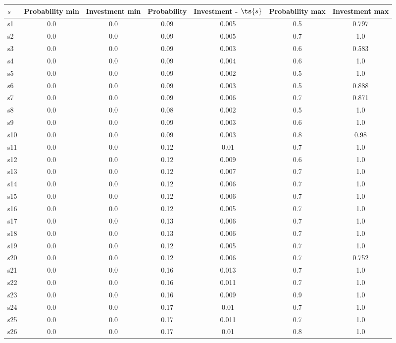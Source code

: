 \documentclass{article}
\begin{document}
\noindent\begin{tabular}{|l|c|c|c|c|c|c|}
\hline
$s$& Probability min & Investment min & Probability & Investment - $\ts{s}$ & Probability max & Investment max\\
\hline
s1 &0.0 & 0.0 & 0.09 & 0.005 & 0.5 & 0.797\\
\hline
s2 &0.0 & 0.0 & 0.09 & 0.005 & 0.7 & 1.0\\
\hline
s3 &0.0 & 0.0 & 0.09 & 0.003 & 0.6 & 0.583\\
\hline
s4 &0.0 & 0.0 & 0.09 & 0.004 & 0.6 & 1.0\\
\hline
s5 &0.0 & 0.0 & 0.09 & 0.002 & 0.5 & 1.0\\
\hline
s6 &0.0 & 0.0 & 0.09 & 0.003 & 0.5 & 0.888\\
\hline
s7 &0.0 & 0.0 & 0.09 & 0.006 & 0.7 & 0.871\\
\hline
s8 &0.0 & 0.0 & 0.08 & 0.002 & 0.5 & 1.0\\
\hline
s9 &0.0 & 0.0 & 0.09 & 0.003 & 0.6 & 1.0\\
\hline
s10 &0.0 & 0.0 & 0.09 & 0.003 & 0.8 & 0.98\\
\hline
s11 &0.0 & 0.0 & 0.12 & 0.01 & 0.7 & 1.0\\
\hline
s12 &0.0 & 0.0 & 0.12 & 0.009 & 0.6 & 1.0\\
\hline
s13 &0.0 & 0.0 & 0.12 & 0.007 & 0.7 & 1.0\\
\hline
s14 &0.0 & 0.0 & 0.12 & 0.006 & 0.7 & 1.0\\
\hline
s15 &0.0 & 0.0 & 0.12 & 0.006 & 0.7 & 1.0\\
\hline
s16 &0.0 & 0.0 & 0.12 & 0.005 & 0.7 & 1.0\\
\hline
s17 &0.0 & 0.0 & 0.13 & 0.006 & 0.7 & 1.0\\
\hline
s18 &0.0 & 0.0 & 0.13 & 0.006 & 0.7 & 1.0\\
\hline
s19 &0.0 & 0.0 & 0.12 & 0.005 & 0.7 & 1.0\\
\hline
s20 &0.0 & 0.0 & 0.12 & 0.006 & 0.7 & 0.752\\
\hline
s21 &0.0 & 0.0 & 0.16 & 0.013 & 0.7 & 1.0\\
\hline
s22 &0.0 & 0.0 & 0.16 & 0.011 & 0.7 & 1.0\\
\hline
s23 &0.0 & 0.0 & 0.16 & 0.009 & 0.9 & 1.0\\
\hline
s24 &0.0 & 0.0 & 0.17 & 0.01 & 0.7 & 1.0\\
\hline
s25 &0.0 & 0.0 & 0.17 & 0.011 & 0.7 & 1.0\\
\hline
s26 &0.0 & 0.0 & 0.17 & 0.01 & 0.8 & 1.0\\

\end{tabular}
\end{document}
